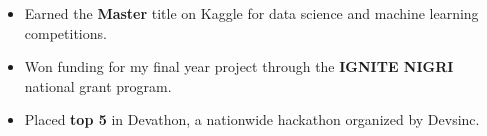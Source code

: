 \normalsize
\begin{itemize}[leftmargin=*, itemsep=2pt]
  \item Earned the \textbf{Master} title on Kaggle for data science and machine learning competitions.
  \item Won funding for my final year project through the \textbf{IGNITE NIGRI} national grant program.
  \item Placed \textbf{top 5} in Devathon, a nationwide hackathon organized by Devsinc.
\end{itemize}
